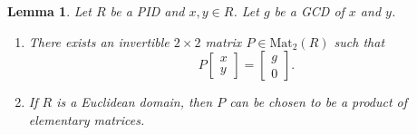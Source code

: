\documentclass[12pt]{report}
\newtheorem{lemma}[theorem]{Lemma}
\numberwithin{equation}{section}
\numberwithin{theorem}{chapter}
\theoremstyle{definition}
\newtheorem*{basic properties}{Basic Properties}
\newtheorem*{Important Remark}{Important Remark}
\begin{document}
 
 

\begin{lemma}\label{lemma gcd move by invertible}
	Let $R$ be a PID and $x, y \in R$. Let $g$ be a GCD of $x$ and $y$.
	\begin{enumerate}
	\item There exists an invertible $2 \times 2$ matrix $P \in \mathrm{Mat}_{2}(R)$ such that
	$$P \begin{bmatrix} x \\ y\end{bmatrix} = \begin{bmatrix} g \\ 0 \end{bmatrix}.$$
	\item If $R$ is a Euclidean domain, then $P$ can be chosen to be a product of elementary matrices.
	\end{enumerate}
\end{lemma}
\end{document}

